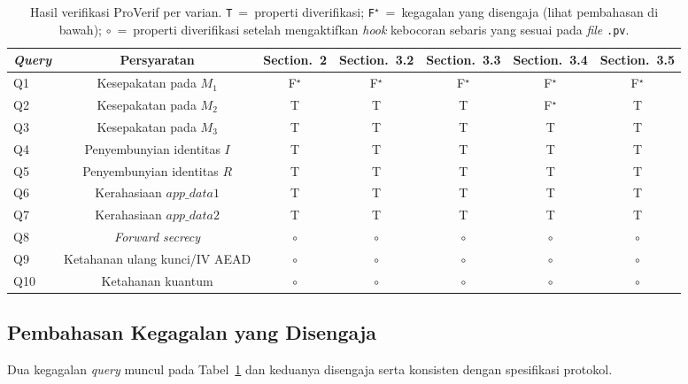 \documentclass{easychair}
\newcommand{\VarSecShort}[1]{Section.~#1}
\begin{document}
\begin{table}[h]
\centering
\footnotesize
\caption{Hasil verifikasi ProVerif per varian.
\texttt{T}~=~properti diverifikasi; \texttt{F$^\star$}~=~kegagalan
yang disengaja (lihat pembahasan di bawah); $\circ$~=~properti
diverifikasi setelah mengaktifkan \emph{hook} kebocoran sebaris yang
sesuai pada \emph{file} \texttt{.pv}.}
\label{tab:proverif-results}
\begin{tabular}{lcccccc}
\toprule
\textbf{\emph{Query}} & \textbf{Persyaratan}
& \textbf{\VarSecShort{2}} & \textbf{\VarSecShort{3.2}} & \textbf{\VarSecShort{3.3}}
& \textbf{\VarSecShort{3.4}} & \textbf{\VarSecShort{3.5}} \\
\midrule
Q1  & Kesepakatan pada $M_1$               & F$^\star$ & F$^\star$ & F$^\star$ & F$^\star$ & F$^\star$ \\
Q2  & Kesepakatan pada $M_2$               & T & T & T & F$^\star$ & T \\
Q3  & Kesepakatan pada $M_3$               & T & T & T & T & T \\
Q4  & Penyembunyian identitas $I$           & T & T & T & T & T \\
Q5  & Penyembunyian identitas $R$           & T & T & T & T & T \\
Q6  & Kerahasiaan $\mathit{app\_data1}$    & T & T & T & T & T \\
Q7  & Kerahasiaan $\mathit{app\_data2}$    & T & T & T & T & T \\
Q8  & \emph{Forward secrecy}               & $\circ$ & $\circ$ & $\circ$ & $\circ$ & $\circ$ \\
Q9  & Ketahanan ulang kunci/IV AEAD        & $\circ$ & $\circ$ & $\circ$ & $\circ$ & $\circ$ \\
Q10 & Ketahanan kuantum                    & $\circ$ & $\circ$ & $\circ$ & $\circ$ & $\circ$ \\
\bottomrule
\end{tabular}
\end{table}

\subsection{Pembahasan Kegagalan yang Disengaja}
Dua kegagalan \emph{query} muncul pada Tabel~\ref{tab:proverif-results}
dan keduanya disengaja serta konsisten dengan spesifikasi protokol.
\end{document}

